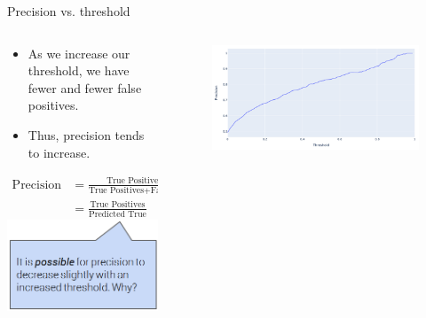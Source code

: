 \documentclass[aspectratio=169]{../latex_main/tntbeamer}  %
\begin{document}
	\begin{frame}{Precision vs. threshold}
	    \begin{columns}
	        \begin{column}{.5\textwidth}
	             \begin{itemize}
	                 \item As we increase our threshold, we have fewer and fewer false positives.
	                 \item Thus, precision tends to increase.
	             \end{itemize} 
	             
	             \begin{align*}
	                 \text{Precision} &= \frac{\text{True Positives}}{\text{True Positives} + \text{False Positives}}\\
	                 &= \frac{\text{True Positives}}{\text{Predicted True}}
	             \end{align*}
	                 \hspace{1cm} \includegraphics[scale=.25]{Bild19}
	        \end{column}
	        
	        
	        \begin{column}{.5\textwidth}
	                \begin{figure}
	                    \centering
	                    \includegraphics[scale=.6]{Bild18}
	                \end{figure}
	                
	                
	        \end{column}
	        
	    \end{columns}
	\end{frame}
	
\end{document}

